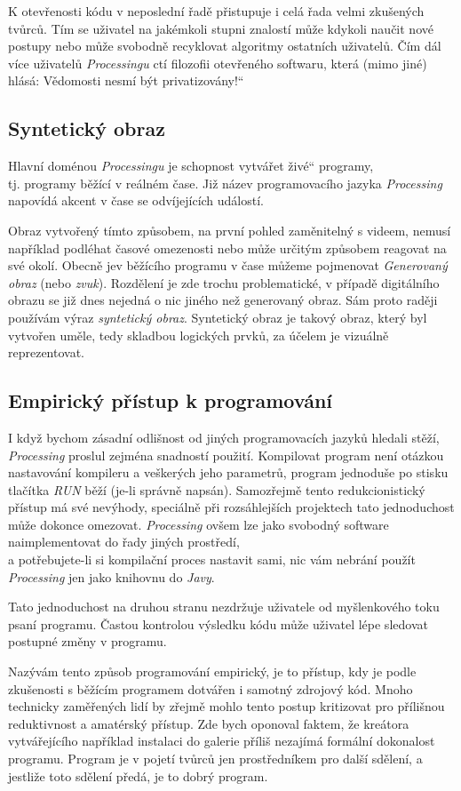 \documentclass[10pt,twoside=true,open=right,cleardoublepage=empty,chapterprefix=true]{scrbook}
\renewcommand\uv[1]{\quotedblbase #1\textquotedblleft}%
\newcommand{\pododdil}[1]{\subsection{#1}\index{#1}\label{#1}}
\begin{document}
K otevřenosti kódu v neposlední řadě přistupuje i celá řada velmi zkušených tvůrců. Tím se uživatel na jakémkoli stupni znalostí může kdykoli naučit nové postupy nebo může svobodně recyklovat algoritmy ostatních uživatelů. Čím dál více uživatelů {\em Processingu} ctí filozofii otevřeného softwaru, která (mimo jiné) hlásá: \uv{Vědomosti nesmí být privatizovány!}

\pododdil{Syntetický obraz}

Hlavní doménou {\em Processingu} je schopnost vytvářet \uv{živé} programy, \\ tj. programy běžící v reálném čase. Již název programovacího jazyka {\em Processing} napovídá akcent v čase se odvíjejících událostí.

Obraz vytvořený tímto způsobem, na první pohled zaměnitelný s videem, nemusí například podléhat časové omezenosti nebo může určitým způsobem reagovat na své okolí. Obecně jev běžícího programu v čase můžeme pojmenovat {\em Generovaný obraz} (nebo {\em zvuk}). Rozdělení je zde trochu problematické, v případě digitálního obrazu se již dnes nejedná o nic jiného než generovaný obraz. Sám proto raději používám výraz {\em syntetický obraz}. Syntetický obraz je takový obraz, který byl vytvořen uměle, tedy skladbou logických prvků, za účelem je vizuálně reprezentovat. 


\pododdil{Empirický přístup k programování}

	I když bychom zásadní odlišnost od jiných programovacích jazyků hledali stěží, {\em Processing} proslul zejména snadností použití. Kompilovat program není otázkou nastavování kompileru a veškerých jeho parametrů, program jednoduše po stisku tlačítka {\em RUN} běží (je-li správně napsán). Samozřejmě tento redukcionistický přístup má své nevýhody, speciálně při rozsáhlejších projektech tato jednoduchost může dokonce omezovat. {\em Processing} ovšem lze jako svobodný software naimplementovat do řady jiných prostředí, \\a potřebujete-li si kompilační proces nastavit sami, nic vám nebrání použít {\em Processing} jen jako knihovnu do {\em Javy}.

Tato jednoduchost na druhou stranu nezdržuje uživatele od myšlenkového toku psaní programu. Častou kontrolou výsledku kódu může uživatel lépe sledovat postupné změny v programu.

Nazývám tento způsob programování empirický, je to přístup, kdy je podle zkušenosti s běžícím programem dotvářen i samotný zdrojový kód. Mnoho technicky zaměřených lidí by zřejmě mohlo tento postup kritizovat pro přílišnou reduktivnost a amatérský přístup. Zde bych oponoval faktem, že kreátora vytvářejícího například instalaci do galerie příliš nezajímá formální dokonalost programu. Program je v pojetí tvůrců jen prostředníkem pro další sdělení, a jestliže toto sdělení předá, je to dobrý program.
\end{document}
